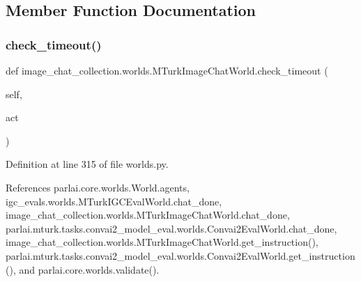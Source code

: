 \subsection{Member Function Documentation}
\mbox{\label{classimage__chat__collection_1_1worlds_1_1MTurkImageChatWorld_a333c8d7353ed7fba417461177035c209}} 
\subsubsection{\texorpdfstring{check\+\_\+timeout()}{check\_timeout()}}
{\footnotesize\ttfamily def image\+\_\+chat\+\_\+collection.\+worlds.\+M\+Turk\+Image\+Chat\+World.\+check\+\_\+timeout (\begin{DoxyParamCaption}\item[{}]{self,  }\item[{}]{act }\end{DoxyParamCaption})}



Definition at line 315 of file worlds.\+py.



References parlai.\+core.\+worlds.\+World.\+agents, igc\+\_\+evals.\+worlds.\+M\+Turk\+I\+G\+C\+Eval\+World.\+chat\+\_\+done, image\+\_\+chat\+\_\+collection.\+worlds.\+M\+Turk\+Image\+Chat\+World.\+chat\+\_\+done, parlai.\+mturk.\+tasks.\+convai2\+\_\+model\+\_\+eval.\+worlds.\+Convai2\+Eval\+World.\+chat\+\_\+done, image\+\_\+chat\+\_\+collection.\+worlds.\+M\+Turk\+Image\+Chat\+World.\+get\+\_\+instruction(), parlai.\+mturk.\+tasks.\+convai2\+\_\+model\+\_\+eval.\+worlds.\+Convai2\+Eval\+World.\+get\+\_\+instruction(), and parlai.\+core.\+worlds.\+validate().




